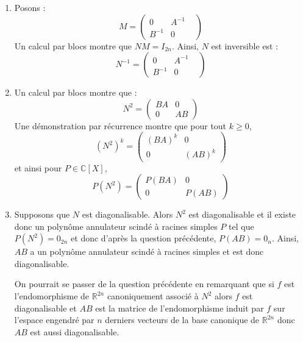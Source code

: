 \documentclass[a4paper,10pt]{report}
\begin{document}
\corr \begin{enumerate}
\item Posons :
$$ M = \begin{pmatrix}
0 & A^{-1} \\
B^{-1} & 0& 
\end{pmatrix}$$
Un calcul par blocs montre que $NM=I_{2n}$. Ainsi, $N$ est inversible est :
$$ N^{-1} = \begin{pmatrix}
0 & A^{-1} \\
B^{-1} & 0& 
\end{pmatrix}$$
\item Un calcul par blocs montre que :
$$ N^{2} = \begin{pmatrix}
BA & 0 \\
0 & AB
\end{pmatrix}$$
Une démonstration par récurrence montre que pour tout $k \geq 0$,
$$ (N^2)^k =  \begin{pmatrix}
(BA)^k & 0 \\
0 & (AB)^k
\end{pmatrix}$$
et ainsi pour $P \in \mathbb{C}[X]$, 
$$ P(N^2) = \begin{pmatrix}
P(BA) & 0 \\
0 & P(AB) 
\end{pmatrix}$$
\item Supposons que $N$ est diagonalisable. Alors $N^2$ est diagonalisable et il existe donc un polynôme annulateur scindé à racines simples $P$ tel que $P(N^2)=0_{2n}$ et donc d'après la question précédente, $P(AB)=0_n$. Ainsi, $AB$ a un polynôme annulateur scindé à racines simples et est donc diagonalisable.

\medskip

\noindent On pourrait se passer de la question précédente en remarquant que si $f$ est l'endomorphisme de $\mathbb{R}^{2n}$ canoniquement associé à $N^2$ alors $f$ est diagonalisable et $AB$ est la matrice de l'endomorphisme induit par $f$ sur l'espace engendré par $n$ derniers vecteurs de la base canonique de $\mathbb{R}^{2n}$ donc $AB$ est aussi diagonalisable.

\medskip


\end{enumerate}
\end{document}
